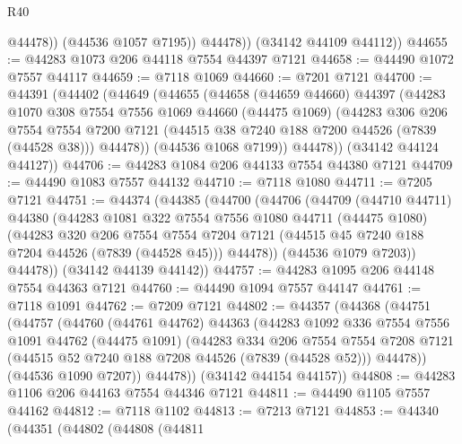 \begin{lexlean}{R40}
\begin{coremodule}
                @44478))
            (@44536 @1057 @7195))
          @44478))
      (@34142 @44109 @44112))
@44655 := @44283 @1073 @206 @44118 @7554 @44397 @7121
@44658 := @44490 @1072 @7557 @44117
@44659 := @7118 @1069
@44660 := @7201 @7121
@44700 := @44391
    (@44402
      (@44649
        (@44655
          (@44658
            (@44659 @44660)
            @44397
            (@44283
              @1070
              @308
              @7554
              @7556
              @1069
              @44660
              (@44475 @1069)
              (@44283
                @306
                @206
                @7554
                @7554
                @7200
                @7121
                (@44515 @38 @7240 @188 @7200 @44526 (@7839 (@44528 @38)))
                @44478))
            (@44536 @1068 @7199))
          @44478))
      (@34142 @44124 @44127))
@44706 := @44283 @1084 @206 @44133 @7554 @44380 @7121
@44709 := @44490 @1083 @7557 @44132
@44710 := @7118 @1080
@44711 := @7205 @7121
@44751 := @44374
    (@44385
      (@44700
        (@44706
          (@44709
            (@44710 @44711)
            @44380
            (@44283
              @1081
              @322
              @7554
              @7556
              @1080
              @44711
              (@44475 @1080)
              (@44283
                @320
                @206
                @7554
                @7554
                @7204
                @7121
                (@44515 @45 @7240 @188 @7204 @44526 (@7839 (@44528 @45)))
                @44478))
            (@44536 @1079 @7203))
          @44478))
      (@34142 @44139 @44142))
@44757 := @44283 @1095 @206 @44148 @7554 @44363 @7121
@44760 := @44490 @1094 @7557 @44147
@44761 := @7118 @1091
@44762 := @7209 @7121
@44802 := @44357
    (@44368
      (@44751
        (@44757
          (@44760
            (@44761 @44762)
            @44363
            (@44283
              @1092
              @336
              @7554
              @7556
              @1091
              @44762
              (@44475 @1091)
              (@44283
                @334
                @206
                @7554
                @7554
                @7208
                @7121
                (@44515 @52 @7240 @188 @7208 @44526 (@7839 (@44528 @52)))
                @44478))
            (@44536 @1090 @7207))
          @44478))
      (@34142 @44154 @44157))
@44808 := @44283 @1106 @206 @44163 @7554 @44346 @7121
@44811 := @44490 @1105 @7557 @44162
@44812 := @7118 @1102
@44813 := @7213 @7121
@44853 := @44340
    (@44351
      (@44802
        (@44808
          (@44811

\end{coremodule}
\end{lexlean}
